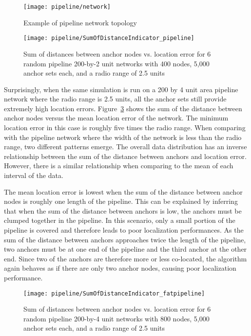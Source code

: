 \begin{figure}
  \centering
	\texttt{[image: pipeline/network]}
	\caption{Example of pipeline network topology}
	\label{fig:pipeline}
\end{figure}

\begin{figure}
  \centering
	\texttt{[image: pipeline/SumOfDistanceIndicator\_pipeline]}
	\caption[Sum of distances between anchor nodes vs. location error in a pipeline topology]{Sum of distances between anchor nodes vs. location error for 6 random pipeline 200-by-2 unit networks with 400 nodes, 5,000 anchor sets each, and a radio range of 2.5 units}
	\label{fig:pipelineindicator}
\end{figure}

Surprisingly, when the same simulation is run on a 200 by 4 unit area pipeline network where the radio range is 2.5 units, all the anchor sets still provide extremely high location errors.  Figure~\ref{fig:fatpipelineindicator} shows the sum of the distance between anchor nodes versus the mean location error of the network.  The minimum location error in this case is roughly five times the radio range.  When comparing with the pipeline network where the width of the network is less than the radio range, two different patterns emerge.  The overall data distribution has an inverse relationship between the sum of the distance between anchors and location error.  However, there is a similar relationship when comparing to the mean of each interval of the data.  

The mean location error is lowest when the sum of the distance between anchor nodes is roughly one length of the pipeline.  This can be explained by inferring that when the sum of the distance between anchors is low, the anchors must be clumped together in the pipeline.  In this scenario, only a small portion of the pipeline is covered and therefore leads to poor localization performances. As the sum of the distance between anchors approaches twice the length of the pipeline, two anchors must be at one end of the pipeline and the third anchor at the other end.  Since two of the anchors are therefore more or less co-located, the algorithm again behaves as if there are only two anchor nodes, causing poor localization performance.

\begin{figure}
  \centering
	\texttt{[image: pipeline/SumOfDistanceIndicator\_fatpipeline]}
	\caption[Sum of distances between anchor nodes vs. location error in a pipeline topology]{Sum of distances between anchor nodes vs. location error for 6 random pipeline 200-by-4 unit networks with 800 nodes, 5,000 anchor sets each, and a radio range of 2.5 units}
	\label{fig:fatpipelineindicator}
\end{figure}

